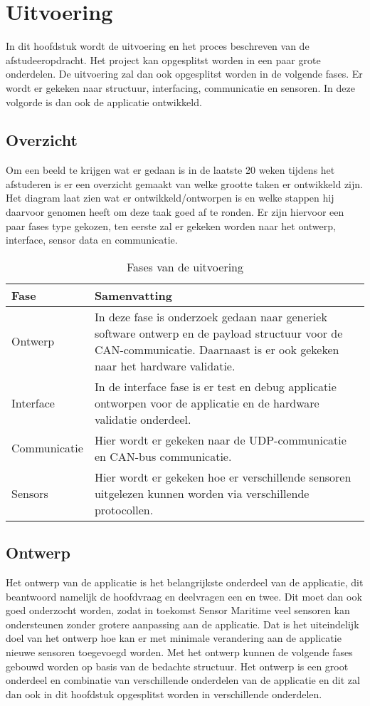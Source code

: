 \chapter{Uitvoering}
In dit hoofdstuk wordt de uitvoering en het proces beschreven van de afstudeeropdracht. Het project kan opgesplitst worden in een paar grote onderdelen. De uitvoering zal dan ook opgesplitst worden in de volgende fases. Er wordt er gekeken naar structuur, interfacing, communicatie en sensoren. In deze volgorde is dan ook de applicatie ontwikkeld.

\section{Overzicht}
Om een beeld te krijgen wat er gedaan is in de laatste 20 weken tijdens het afstuderen is er een overzicht gemaakt van welke grootte taken er ontwikkeld zijn. Het diagram laat zien wat er ontwikkeld/ontworpen is en welke stappen hij daarvoor genomen heeft om deze taak goed af te ronden. Er zijn hiervoor een paar fases type gekozen, ten eerste zal er gekeken worden naar het ontwerp, interface, sensor data en communicatie.

\begin{table}[h!]
	\centering
	\caption{Fases van de uitvoering}
	\label{tab:UitvoeringOverzicht}
	\begin{tabular}{lp{13cm}}
	\toprule
	\textbf{Fase} & \textbf{Samenvatting} \\ \midrule
	Ontwerp 				& In deze fase is onderzoek gedaan naar generiek software ontwerp en de payload structuur voor de CAN-communicatie. Daarnaast is er ook gekeken naar het hardware validatie. \\
	Interface 				& In de interface fase is er test en debug applicatie ontworpen voor de applicatie en de hardware validatie onderdeel. 	\\
	Communicatie 			& Hier wordt er gekeken naar de UDP-communicatie en CAN-bus communicatie.												\\
	Sensors  				& Hier wordt er gekeken hoe er verschillende sensoren uitgelezen kunnen worden via verschillende protocollen.			\\ \bottomrule
	\end{tabular}
\end{table}

\newpage
\section{Ontwerp}
Het ontwerp van de applicatie is het belangrijkste onderdeel van de applicatie, dit beantwoord namelijk de hoofdvraag en deelvragen een en twee. Dit moet dan ook goed onderzocht worden, zodat in toekomst Sensor Maritime veel sensoren kan ondersteunen zonder grotere aanpassing aan de applicatie. Dat is het uiteindelijk doel van het ontwerp hoe kan er met minimale verandering aan de applicatie nieuwe sensoren toegevoegd worden. Met het ontwerp kunnen de volgende fases gebouwd worden op basis van de bedachte structuur. Het ontwerp is een groot onderdeel en combinatie van verschillende onderdelen van de applicatie en dit zal dan ook in dit hoofdstuk opgesplitst worden in verschillende onderdelen.

